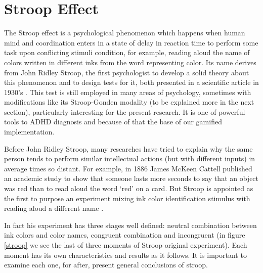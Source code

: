 \section{Stroop Effect}



The Stroop effect is a psychological phenomenon which happens when human mind and coordination enters in a state of delay in reaction time to perform some task upon conflicting stimuli  condition, for example, reading aloud the name of colors written in different inks from the word representing color. Its name derives from John Ridley Stroop, the first psychologist to develop a solid theory about this phenomenon and to design tests for it, both presented in a scientific article in 1930's \citep{Studies1935}. This test is still employed in many areas of psychology, sometimes with modifications like its Stroop-Gonden modality (to be explained more in the next section), particularly interesting for the present research. It is one of powerful tools to ADHD diagnosis and because of that the base of our gamified implementation.



Before John Ridley Stroop, many researches have tried to explain why the same person tends to perform similar intellectual actions (but with different inputs) in average times so distant. For example, in 1886 James McKeen Cattell published an academic study to show that someone lasts more seconds to say that an object was red than to read aloud the word `red' on a card. But Stroop is appointed as the first to purpose an experiment mixing ink color identification stimulus with reading aloud a different name \citep{macleod}. 



In fact his experiment has three stages well defined: neutral combination between ink colors and color names, congruent combination and incongruent (in figure \ref{stroop} we see the last of three moments of Stroop original experiment). Each moment has its own characteristics and results as it follows. It is important to examine each one, for after, present general conclusions of stroop. 



